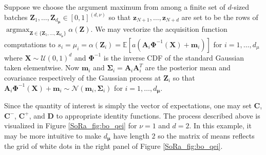 \documentclass[graybox]{svmult}
\begin{document}
Suppose we choose the argument maximum  from among a finite set of $d$-sized batches $\boldsymbol{Z}_1,\dots,\boldsymbol{Z}_{d_{\boldsymbol{\mu}}} \in [0,1]^{(d,\nu)}$ so that $\boldsymbol{z}_{N+1}, \dots,\boldsymbol{z}_{N+d}$ are set to be the rows of $\mathop{\text{argmax}}_{\boldsymbol{Z} \in \{\boldsymbol{Z}_1,\dots,\boldsymbol{Z}_{d_{\boldsymbol{\mu}}}\}}\alpha(\boldsymbol{Z})$. We may vectorize the acquisition function computations to $s_i = \mu_i = \alpha(\boldsymbol{Z}_i) = \mathbb{E}\left[a\left(\boldsymbol{A}_i\boldsymbol{\Phi}^{-1}(\boldsymbol{X})+\boldsymbol{m}_i\right)\right]$ for $i=1,\dots,d_\mu$ where $\boldsymbol{X} \sim \mathcal{U}(0,1)^d$ and $\boldsymbol{\Phi}^{-1}$ is the inverse CDF of the standard Gaussian taken elementwise. Now $\boldsymbol{m}_i$ and $\boldsymbol{\Sigma}_i = \boldsymbol{A}_i\boldsymbol{A}_i^T$ are the posterior mean and covariance respectively of the Gaussian process at $\boldsymbol{Z}_i$ so that $\boldsymbol{A}_i\boldsymbol{\Phi}^{-1}(\boldsymbol{X})+\boldsymbol{m}_i \sim \mathcal{N}\left(\boldsymbol{m}_i,\boldsymbol{\Sigma}_i\right)$ for $i=1,\dots,d_{\boldsymbol{\mu}}$.

Since the quantity of interest is simply the vector of expectations, one may set $\boldsymbol{C}$, $\boldsymbol{C}^-$, $\boldsymbol{C}^+$, and $\boldsymbol{D}$ to appropriate identity functions. The process described above is visualized in Figure \ref{SoRa_fig:bo_qei} for $\nu=1$ and $d=2$. In this example, it may be more intuitive to make $d_{\boldsymbol{\mu}}$ have length $2$ so the matrix of means reflects the grid of white dots in the right panel of Figure \ref{SoRa_fig:bo_qei}. 

\end{document}
